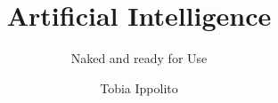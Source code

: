 
\usepackage[T1]{fontenc}
\usepackage{lmodern}

\usepackage[english]{babel}  %
\usepackage{blindtext}

\usepackage{microtype}

\frenchspacing

\title{Artificial Intelligence}
\subtitle{Naked and ready for Use}
\author{Tobia Ippolito}
\date{}





